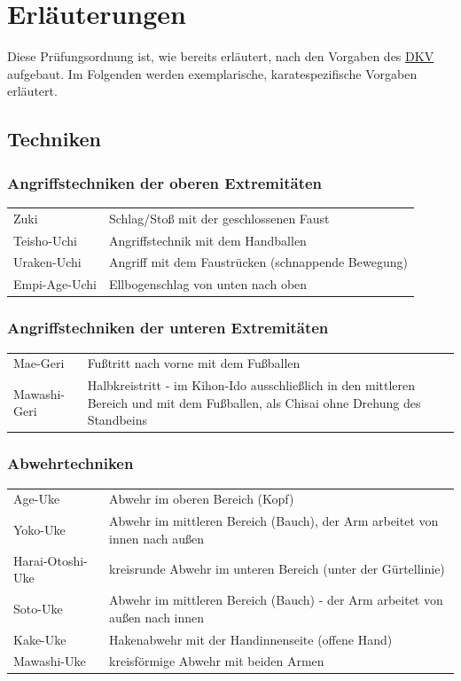 	\vspace{12pt}
	\section{Erläuterungen}
		Diese Prüfungsordnung ist, wie bereits erläutert, nach den Vorgaben des \href{https://www.karate.de/}{DKV} aufgebaut. Im Folgenden werden exemplarische, karatespezifische Vorgaben erläutert.
		\subsection{Techniken}
			\subsubsection{Angriffstechniken der oberen Extremitäten}
				\begin{tabularx}{\textwidth}{p{100pt}X}
					Zuki			&	Schlag/Stoß mit der geschlossenen Faust\\
					Teisho-Uchi		&	Angriffstechnik mit dem Handballen\\
					Uraken-Uchi		&	Angriff mit dem Faustrücken (schnappende Bewegung)\\
					Empi-Age-Uchi	& Ellbogenschlag von unten nach oben\\
				\end{tabularx}
			\subsubsection{Angriffstechniken der unteren Extremitäten}
				\begin{tabularx}{\textwidth}{p{100pt}X}
					Mae-Geri		&	Fußtritt nach vorne mit dem Fußballen\\
					Mawashi-Geri	&	Halbkreistritt - im Kihon-Ido ausschließlich in den mittleren Bereich und mit dem Fußballen, als Chisai ohne Drehung des Standbeins\\
				\end{tabularx}
			\subsubsection{Abwehrtechniken}
				\begin{tabularx}{\textwidth}{p{100pt}X}
					Age-Uke				&	Abwehr im oberen Bereich (Kopf)\\
					Yoko-Uke			&	Abwehr im mittleren Bereich (Bauch), der Arm arbeitet von innen nach außen\\
					Harai-Otoshi-Uke	& kreisrunde Abwehr im unteren Bereich (unter der Gürtellinie)\\
					Soto-Uke			&	Abwehr im mittleren Bereich (Bauch) - der Arm arbeitet von außen nach innen\\
					Kake-Uke			&	Hakenabwehr mit der Handinnenseite (offene Hand)\\
					Mawashi-Uke			&	kreisförmige Abwehr mit beiden Armen
				\end{tabularx}
